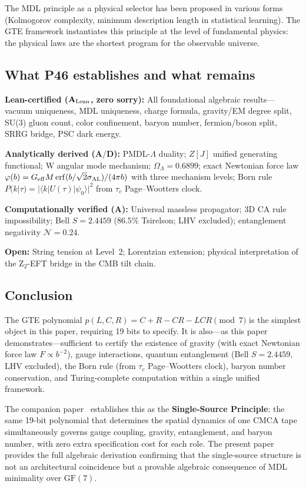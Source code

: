 \documentclass[11pt]{article}
\theoremstyle{remark}
\newcommand{\OmegaL}{\Omega_\Lambda}
\newcommand{\GFseven}{\mathrm{GF}(7)}
\newcommand{\CatA}{\textbf{A}}
\newcommand{\CatAL}{\ensuremath{\textbf{A}_{\rm Lean}}}
\newcommand{\CatAD}{\textbf{A/D}}
\begin{document}
The MDL principle as a physical selector has been proposed in various forms
(Kolmogorov complexity, minimum description length in statistical learning). The
GTE framework instantiates this principle at the level of fundamental physics:
the physical laws are the shortest program for the observable universe.

\subsection{What P46 establishes and what remains}
\label{ssec:status}

\noindent\textbf{Lean-certified ($\CatAL$, zero sorry):}
All foundational algebraic results---vacuum uniqueness, MDL uniqueness, charge
formula, gravity/EM degree split, SU(3) gluon count, color confinement, baryon
number, fermion/boson split, SRRG bridge, PSC dark energy.

\noindent\textbf{Analytically derived ($\CatAD$):}
PMDL-$\Lambda$ duality; $Z[J]$ unified generating functional; W angular mode
mechanism; $\OmegaL = 0.6899$; exact Newtonian force law
$\varphi(b)=G_{\rm eff}M\,\mathrm{erf}(b/\sqrt{2}\sigma_{\rm AL})/(4\pi b)$
with three mechanism levels; Born rule $P(k|\tau)=|\langle k|U(\tau)|\psi_0\rangle|^2$
from $\tau_c$ Page--Wootters clock.

\noindent\textbf{Computationally verified ($\CatA$):}
Universal massless propagator; 3D CA rule impossibility; Bell $S=2.4459$
($86.5\%$ Tsirelson; LHV excluded); entanglement negativity $\mathcal{N}=0.24$.

\noindent\textbf{Open:}
String tension at Level~2; Lorentzian extension; physical interpretation of the
Z$_2$-EFT bridge in the CMB tilt chain.

\subsection{Conclusion}
\label{ssec:concl}

The GTE polynomial $p(L,C,R) = C+R-CR-LCR\pmod7$ is the simplest object in
this paper, requiring 19 bits to specify. It is also---as this paper
demonstrates---sufficient to certify the existence of gravity (with exact Newtonian
force law $F\propto b^{-2}$), gauge interactions, quantum entanglement (Bell
$S=2.4459$, LHV excluded), the Born rule (from $\tau_c$ Page--Wootters clock),
baryon number conservation, and Turing-complete computation within a single
unified framework.

The companion paper~\cite{SpivackThreeTapeCMCA} establishes this as the
\textbf{Single-Source Principle}: the same 19-bit polynomial that determines the
spatial dynamics of one CMCA tape simultaneously governs gauge coupling, gravity,
entanglement, and baryon number, with zero extra specification cost for each role.
The present paper provides the full algebraic derivation confirming that the
single-source structure is not an architectural coincidence but a provable
algebraic consequence of MDL minimality over $\GFseven$.
\end{document}
